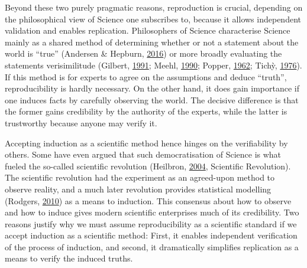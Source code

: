 \documentclass[12pt,a4paper,]{article}
\begin{document}
Beyond these two purely pragmatic reasons, reproduction is crucial, depending on the philosophical view of Science one subscribes to, because it allows independent validation and enables replication.
Philosophers of Science characterise Science mainly as a shared method of determining whether or not a statement about the world is ``true'' (Andersen \& Hepburn, \protect\hyperlink{ref-andersonScientificMethod2016}{2016}) or more broadly evaluating the statements verisimilitude (Gilbert, \protect\hyperlink{ref-gilbertModelBuildingDefinition1991}{1991}; Meehl, \protect\hyperlink{ref-meehlAppraisingAmendingTheories1990}{1990}; Popper, \protect\hyperlink{ref-popperCommentsTruthGrowth1962}{1962}; Tichỳ, \protect\hyperlink{ref-tichyVerisimilitudeRedefined1976}{1976}).
If this method is for experts to agree on the assumptions and deduce ``truth'', reproducibility is hardly necessary.
On the other hand, it does gain importance if one induces facts by carefully observing the world.
The decisive difference is that the former gains credibility by the authority of the experts, while the latter is trustworthy because anyone may verify it.

Accepting induction as a scientific method hence hinges on the verifiability by others.
Some have even argued that such democratisation of Science is what fueled the so-called scientific revolution (Heilbron, \protect\hyperlink{ref-heilbronOxfordCompanionHistory2004}{2004}, Scientific Revolution).
The scientific revolution had the experiment as an agreed-upon method to observe reality, and a much later revolution provides statistical modelling (Rodgers, \protect\hyperlink{ref-rodgersEpistemologyMathematicalStatistical2010}{2010}) as a means to induction.
This consensus about how to observe and how to induce gives modern scientific enterprises much of its credibility.
Two reasons justify why we must assume reproducibility as a scientific standard if we accept induction as a scientific method:
First, it enables independent verification of the process of induction, and second, it dramatically simplifies replication as a means to verify the induced truths.
\end{document}
